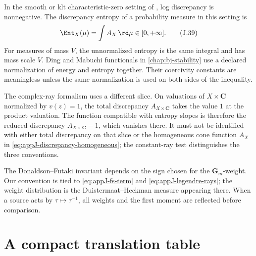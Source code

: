 In the smooth or klt characteristic-zero setting of
, log discrepancy is nonnegative. The discrepancy
entropy of a probability measure in this setting is
\begin{equation*}
 \Ent_X(\mu)=\int A_X\,\rd \mu\in[0,+\infty].
 \tag{J.39}\label{eq:appJ-entropy}
\end{equation*}
For measures of mass \(V\), the unnormalized entropy is the same integral and
has mass scale \(V\).  Ding and Mabuchi functionals in \cref{chap:bj-stability} use a
declared normalization of energy and entropy together.  Their coercivity
constants are meaningless unless the same normalization is used on both
sides of the inequality.

The complex-ray formalism uses a different slice.  On valuations of
\(X\times\mathbf C\) normalized by \(v(z)=1\), the total discrepancy
\(A_{X\times\mathbf C}\) takes the value \(1\) at the product valuation.
The function compatible with entropy slopes is therefore the reduced
discrepancy \(A_{X\times\mathbf C}-1\), which vanishes there.  It must not be
identified with either total discrepancy on that slice or the homogeneous
cone function \(A_X\) in \eqref{eq:appJ-discrepancy-homogeneous}; the
constant-ray test distinguishes the three conventions.

The Donaldson--Futaki invariant depends on the sign chosen for the
\(\mathbf G_m\)-weight.  Our convention is tied to
\eqref{eq:appJ-fs-term} and \eqref{eq:appJ-legendre-rays}; the weight
distribution is the Duistermaat--Heckman measure appearing there.  When a
source acts by \(\tau\mapsto\tau^{-1}\), all weights and the first moment are
reflected before comparison.

\section{A compact translation table}
\label{sec:appJ-table}

